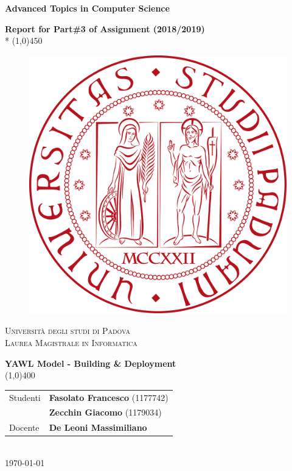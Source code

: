 \documentclass[a4paper,12pt]{article}
\begin{document}

	\begin{titlepage}
		\centering
		\vspace{7cm}
		{\huge\bfseries Advanced Topics in Computer Science\par}
		\vspace*{0,5cm}
		{\Large\bfseries Report for Part\#3 of Assignment (2018/2019)} \\*
		\line(1,0){450} \\
		\vspace*{2cm}
		\begin{figure}[h!]
		    \centering
		    \includegraphics[scale=0.20]{figures/unipd_logo.png}
		    \label{fig:unipd_logo}
		\end{figure}
		{\scshape\Large Università degli studi di Padova\\ \large Laurea Magistrale in Informatica \par}
		\vspace{2cm}
		{\LARGE\bfseries YAWL Model - Building \& Deployment}\\
		\line(1,0){400}\\
		\vspace{1cm}
		\begin{tabular}{l|l}
			 Studenti  & \textbf{Fasolato Francesco} (1177742)\\ & \textbf{Zecchin Giacomo} (1179034) \\
			 Docente    & \textbf{De Leoni Massimiliano} \\
		\end{tabular}\\
		\vspace*{3,5cm}
        \today
	\end{titlepage}
\end{document}
